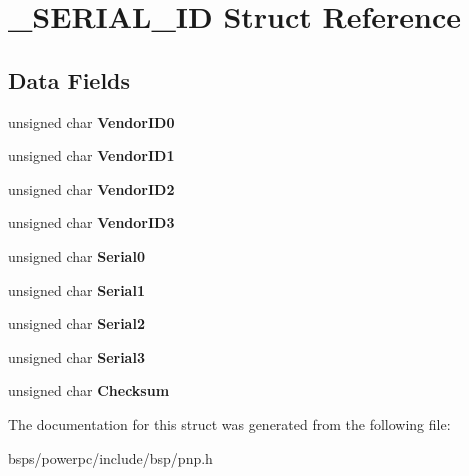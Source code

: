 \hypertarget{struct__SERIAL__ID}{}\section{\+\_\+\+S\+E\+R\+I\+A\+L\+\_\+\+ID Struct Reference}
\label{struct__SERIAL__ID}
\subsection*{Data Fields}
\begin{DoxyCompactItemize}
\item 
\mbox{\label{struct__SERIAL__ID_aa28c3260368e9cf07b39949734b39ef2}} 
unsigned char {\bfseries Vendor\+I\+D0}
\item 
\mbox{\label{struct__SERIAL__ID_a66c3b0f3a3502f804902cddf482be539}} 
unsigned char {\bfseries Vendor\+I\+D1}
\item 
\mbox{\label{struct__SERIAL__ID_a943d0072b2d94d420d4d94016a6774aa}} 
unsigned char {\bfseries Vendor\+I\+D2}
\item 
\mbox{\label{struct__SERIAL__ID_a6295ca46596cd86b84f6103724d6f8eb}} 
unsigned char {\bfseries Vendor\+I\+D3}
\item 
\mbox{\label{struct__SERIAL__ID_a0af615df2b919ebd2ef85823a7aa06fd}} 
unsigned char {\bfseries Serial0}
\item 
\mbox{\label{struct__SERIAL__ID_ab2e9810353f3b131e8c7eb7ddea6f52b}} 
unsigned char {\bfseries Serial1}
\item 
\mbox{\label{struct__SERIAL__ID_ac88f207528d5bac37f57b9a0efb1270e}} 
unsigned char {\bfseries Serial2}
\item 
\mbox{\label{struct__SERIAL__ID_a81c4ed0eda6888017be574614bef0644}} 
unsigned char {\bfseries Serial3}
\item 
\mbox{\label{struct__SERIAL__ID_aa70b12482075c960520d7635e33b70a2}} 
unsigned char {\bfseries Checksum}
\end{DoxyCompactItemize}


The documentation for this struct was generated from the following file\+:\begin{DoxyCompactItemize}
\item 
bsps/powerpc/include/bsp/pnp.\+h\end{DoxyCompactItemize}
